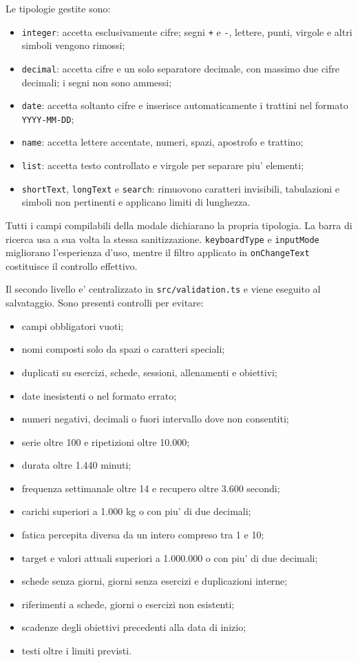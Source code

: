 \documentclass[11pt,a4paper]{article}
\begin{document}
Le tipologie gestite sono:

\begin{itemize}
  \item \texttt{integer}: accetta esclusivamente cifre; segni \texttt{+} e \texttt{-}, lettere, punti, virgole e altri simboli vengono rimossi;
  \item \texttt{decimal}: accetta cifre e un solo separatore decimale, con massimo due cifre decimali; i segni non sono ammessi;
  \item \texttt{date}: accetta soltanto cifre e inserisce automaticamente i trattini nel formato \texttt{YYYY-MM-DD};
  \item \texttt{name}: accetta lettere accentate, numeri, spazi, apostrofo e trattino;
  \item \texttt{list}: accetta testo controllato e virgole per separare piu' elementi;
  \item \texttt{shortText}, \texttt{longText} e \texttt{search}: rimuovono caratteri invisibili, tabulazioni e simboli non pertinenti e applicano limiti di lunghezza.
\end{itemize}

Tutti i campi compilabili della modale dichiarano la propria tipologia. La barra di ricerca usa a sua volta la stessa sanitizzazione. \texttt{keyboardType} e \texttt{inputMode} migliorano l'esperienza d'uso, mentre il filtro applicato in \texttt{onChangeText} costituisce il controllo effettivo.

Il secondo livello e' centralizzato in \texttt{src/validation.ts} e viene eseguito al salvataggio. Sono presenti controlli per evitare:

\begin{itemize}
  \item campi obbligatori vuoti;
  \item nomi composti solo da spazi o caratteri speciali;
  \item duplicati su esercizi, schede, sessioni, allenamenti e obiettivi;
  \item date inesistenti o nel formato errato;
  \item numeri negativi, decimali o fuori intervallo dove non consentiti;
  \item serie oltre 100 e ripetizioni oltre 10.000;
  \item durata oltre 1.440 minuti;
  \item frequenza settimanale oltre 14 e recupero oltre 3.600 secondi;
  \item carichi superiori a 1.000 kg o con piu' di due decimali;
  \item fatica percepita diversa da un intero compreso tra 1 e 10;
  \item target e valori attuali superiori a 1.000.000 o con piu' di due decimali;
  \item schede senza giorni, giorni senza esercizi e duplicazioni interne;
  \item riferimenti a schede, giorni o esercizi non esistenti;
  \item scadenze degli obiettivi precedenti alla data di inizio;
  \item testi oltre i limiti previsti.
\end{itemize}
\end{document}
